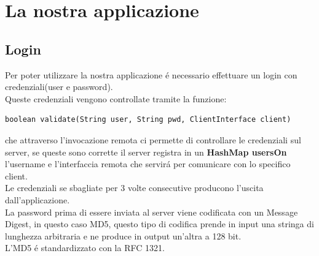 \documentclass[a4paper, 12 pt, italian]{report}
\begin{document}
\chapter{La nostra applicazione}

\section{Login}
Per poter utilizzare la nostra applicazione \'e necessario effettuare un login con credenziali(user e password).\\Queste credenziali vengono controllate tramite la funzione:
\begin{verbatim}
boolean validate(String user, String pwd, ClientInterface client)
\end{verbatim}
che attraverso l'invocazione remota ci permette di controllare le credenziali sul server, se queste sono corrette il server registra in un \textbf{HashMap usersOn} l'username e l'interfaccia remota che servir\'a per comunicare con lo specifico client.\\
Le credenziali se sbagliate per 3 volte consecutive producono l'uscita dall'applicazione.\\
La password prima di essere inviata al server viene codificata con un Message Digest, in questo caso MD5, questo tipo di codifica prende in input una stringa di lunghezza arbitraria e ne produce in output un'altra a 128 bit.\\
L'MD5 \'e standardizzato con la RFC 1321.
\end{document}
